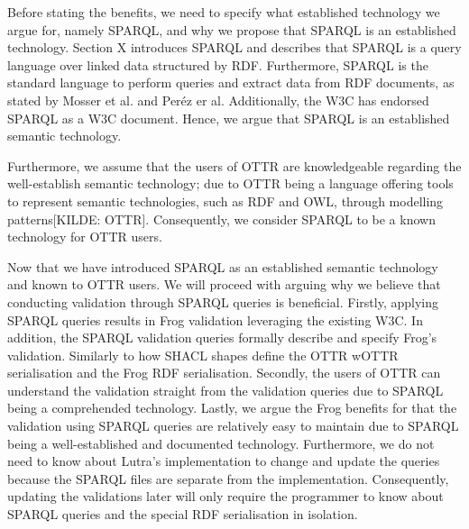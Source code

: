 \para
{}Before stating the benefits, we need to specify what established technology we argue for, namely SPARQL, and why we propose that SPARQL is an established technology. Section X introduces SPARQL and describes that SPARQL is a query language over linked data structured by RDF. Furthermore, SPARQL is the standard language to perform queries and extract data from RDF documents, as stated by Mosser et al.\cite[1]{MosserSPARQL} and Peréz er al\cite[1]{PerezSPARQL}. Additionally, the W3C has endorsed SPARQL as a W3C document. Hence, we argue that SPARQL is an established semantic technology. 

\para
Furthermore, we assume that the users of OTTR are knowledgeable regarding the well-establish semantic technology; due to OTTR being a language offering tools to represent semantic technologies, such as RDF and OWL, through modelling patterns[KILDE: OTTR]. Consequently, we consider SPARQL to be a known technology for OTTR users. 

\para
Now that we have introduced SPARQL as an established semantic technology and known to OTTR users. We will proceed with arguing why we believe that conducting validation through SPARQL queries is beneficial. Firstly, applying SPARQL queries results in Frog validation leveraging the existing W3C. In addition, the SPARQL validation queries formally describe and specify Frog's validation. Similarly to how SHACL shapes define the OTTR wOTTR serialisation and the Frog RDF serialisation. Secondly, the users of OTTR can understand the validation straight from the validation queries due to SPARQL being a comprehended technology. Lastly, we argue the Frog benefits for that the validation using SPARQL queries are relatively easy to maintain due to SPARQL being a well-established and documented technology. Furthermore, we do not need to know about Lutra's implementation to change and update the queries because the SPARQL files are separate from the implementation. Consequently, updating the validations later will only require the programmer to know about SPARQL queries and the special RDF serialisation in isolation.

